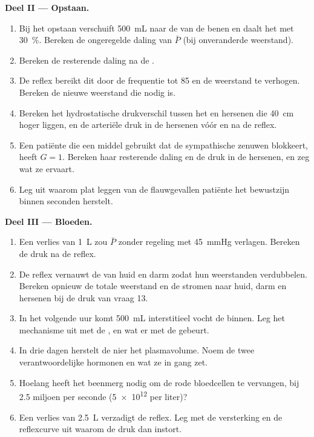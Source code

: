 \begin{problem}
\medskip
\noindent\textbf{Deel II --- Opstaan.}
\begin{enumerate}[resume]
  \item Bij het opstaan verschuift \qty{500}{mL} naar de  van de benen
        en daalt het  met \qty{30}{\%}. Bereken de ongeregelde
        daling van $\bar P$ (bij onveranderde weerstand).
  \item Bereken de resterende daling na de .
  \item De reflex bereikt dit door de frequentie tot 85 en de weerstand te
        verhogen. Bereken de nieuwe weerstand die nodig is.
  \item Bereken het hydrostatische drukverschil tussen het  en hersenen
        die \qty{40}{cm} hoger liggen, en de arteriële druk in de hersenen
        vóór en na de reflex.
  \item Een patiënte die een middel gebruikt dat de sympathische zenuwen
        blokkeert, heeft $G = 1$. Bereken haar resterende daling en de druk
        in de hersenen, en zeg wat ze ervaart.
  \item Leg uit waarom plat leggen van de flauwgevallen patiënte het
        bewustzijn binnen seconden herstelt.
\end{enumerate}

\medskip
\noindent\textbf{Deel III --- Bloeden.}
\begin{enumerate}[resume]
  \item Een verlies van \qty{1}{L} zou $\bar P$ zonder regeling met
        \qty{45}{mmHg} verlagen. Bereken de druk na de reflex.
  \item De reflex vernauwt de  van huid en darm zodat hun
        weerstanden verdubbelen. Bereken opnieuw de totale weerstand en de
        stromen naar huid, darm en hersenen bij de druk van vraag 13.
  \item In het volgende uur komt \qty{500}{mL} interstitieel vocht de
         binnen. Leg het mechanisme uit met de , en wat er met de  gebeurt.
  \item In drie dagen herstelt de nier het plasmavolume. Noem de twee
        verantwoordelijke hormonen en wat ze in gang zet.
  \item Hoelang heeft het beenmerg nodig om de rode bloedcellen te
        vervangen, bij \num{2.5} miljoen per seconde (\num{5e12} per liter)?
  \item Een verlies van \qty{2.5}{L} verzadigt de reflex. Leg met de
        versterking en de reflexcurve uit waarom de druk dan instort.
\end{enumerate}


\end{problem}
